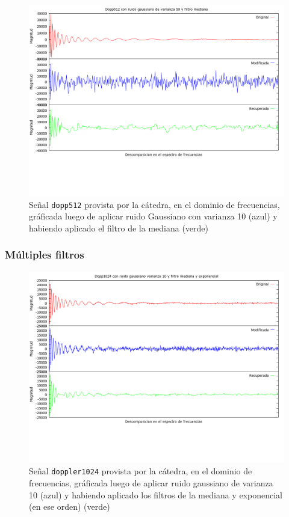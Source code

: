 \begin{figure}[H]
\begin {center}
\includegraphics[width=500pt]{imagenes/dopp512-gauss-50-median.png}
\end {center}
\caption{Se\~nal \texttt{dopp512} provista por la c\'atedra, en el dominio de frecuencias, gr\'aficada
luego de aplicar ruido Gaussiano con varianza 10 (azul) y habiendo aplicado el filtro de la mediana (verde)}
\label{fig:medGauss}
\end{figure}

\subsubsection{M\'ultiples filtros}

\begin{figure}[H]
\begin {center}
\includegraphics[width=500pt]{imagenes/dopp1024-gauss-10-both.png}
\end {center}
\caption{Se\~nal \texttt{doppler1024} provista por la c\'atedra, en el dominio de frecuencias, gr\'aficada
    luego de aplicar ruido gaussiano de varianza 10 (azul) y 
habiendo aplicado los filtros de la mediana y exponencial (en ese orden) (verde)}
\label{fig:medexpGauss10}
\end{figure}

